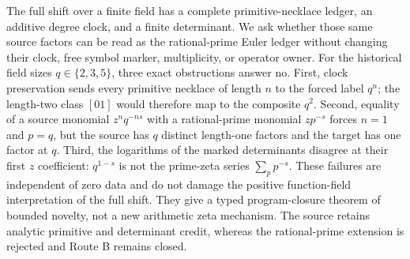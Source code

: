 The full shift over a finite field has a complete primitive-necklace ledger,
an additive degree clock, and a finite determinant. We ask whether those same
source factors can be read as the rational-prime Euler ledger without changing
their clock, free symbol marker, multiplicity, or operator owner. For the
historical field sizes $q\in\{2,3,5\}$, three exact obstructions answer no.
First, clock preservation sends every primitive necklace of length $n$ to the
forced label $q^n$; the length-two class $[01]$ would therefore map to the
composite $q^2$. Second, equality of a source monomial
$z^nq^{-ns}$ with a rational-prime monomial $zp^{-s}$ forces $n=1$ and
$p=q$, but the source has $q$ distinct length-one factors and the target has
one factor at $q$. Third, the logarithms of the marked determinants disagree
at their first $z$ coefficient: $q^{1-s}$ is not the prime-zeta series
$\sum_p p^{-s}$. These failures are independent of zero data and do not
damage the positive function-field interpretation of the full shift. They
give a typed program-closure theorem of bounded novelty, not a new arithmetic
zeta mechanism. The source retains analytic primitive and determinant credit,
whereas the rational-prime extension is rejected and Route B remains closed.
